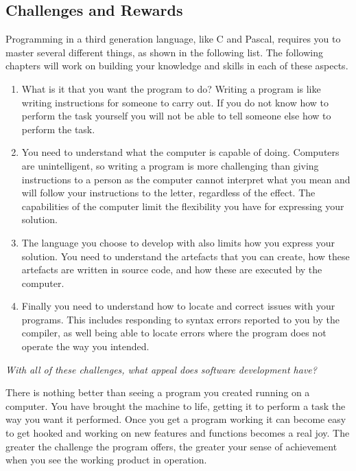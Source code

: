 \clearpage
\subsection{Challenges and Rewards} %
\label{sub:challenges_and_rewards}


Programming in a third generation language, like C and Pascal, requires you to master several different things, as shown in the following list. The following chapters will work on building your knowledge and skills in each of these aspects.

\begin{enumerate}
  \item What is it that you want the program to do? Writing a program is like writing instructions for someone to carry out. If you do not know how to perform the task yourself you will not be able to tell someone else how to perform the task.
  \item You need to understand what the computer is capable of doing. Computers are unintelligent, so writing a program is more challenging than giving instructions to a person as the computer cannot interpret what you mean and will follow your instructions to the letter, regardless of the effect. The capabilities of the computer limit the flexibility you have for expressing your solution.
  \item The language you choose to develop with also limits how you express your solution. You need to understand the artefacts that you can create, how these artefacts are written in source code, and how these are executed by the computer.
  \item Finally you need to understand how to locate and correct issues with your programs. This includes responding to syntax errors reported to you by the compiler, as well being able to locate errors where the program does not operate the way you intended. 
\end{enumerate}

\emph{With all of these challenges, what appeal does software development have?}

There is nothing better than seeing a program you created running on a computer. You have brought the machine to life, getting it to perform a task the way you want it performed. Once you get a program working it can become easy to get hooked and working on new features and functions becomes a real joy. The greater the challenge the program offers, the greater your sense of achievement when you see the working product in operation.

